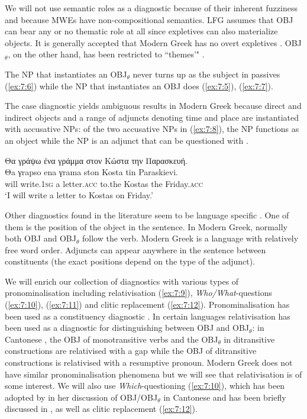\documentclass[output=paper]{langsci/langscibook}
\begin{document}
We will not use semantic roles as a diagnostic because of their inherent fuzziness \citep{dowty90} and because MWEs have non-compositional semantics.  LFG assumes that OBJ can bear any or no thematic role at all since expletives can also materialize objects. It is generally accepted that Modern Greek has no overt expletives \citep{kotzoglou2001}. OBJ$_\theta$, on the other hand, has been restricted to ``themes'" \citep{bresnanmoshi1990}. 

The NP that instantiates an OBJ$_\theta$ never turns up as the subject in passives (\ref{ex:7:6}) while the NP that instantiates an OBJ does (\ref{ex:7:5}), (\ref{ex:7:7}).

The case diagnostic yields ambiguous results in Modern Greek because direct and indirect objects and a range of adjuncts denoting time and place are instantiated with accusative NPs: of the two accusative NPs in (\ref{ex:7:8}), the NP  functions as an object while the  NP  is an adjunct that can be questioned with .  

\ea%
    \label{ex:7:8}
\glll Θα γράψω ένα γράμμα στον Κώστα την Παρασκευή.\\
Θa γrapso ena γrama ston Kosta tin Paraskievi.\\
          will write.\textsc{1sg}   a  letter.\textsc{acc} to.the Kostas the  Friday.\textsc{acc}\\
\glt `I will write a letter to Kostas on Friday.'
\z

Other diagnostics found in the literature seem to be language specific \citep{lam2008}. One of them is the position of the object in the sentence. In Modern Greek, normally both OBJ and OBJ$_\theta$ follow the verb. Modern Greek is a language with relatively free word order. Adjuncts can appear anywhere in the sentence between constituents (the exact positions depend on the type of the adjunct).

We will enrich our collection of diagnostics with various types of pronominalisation  including relativisation (\ref{ex:7:9}), \textit{Who/What}-questions (\ref{ex:7:10}), (\ref{ex:7:11}) and clitic replacement (\ref{ex:7:12}). Pronominalisation has been used as a constituency diagnostic \citep{radford1988}. In certain languages relativisation has been used as a diagnostic for distinguishing between OBJ and OBJ$_\theta$: in Cantonese \citep{lam2008}, the OBJ of monotransitive verbs and the OBJ$_\theta$ in ditransitive constructions are relativised with a gap while the OBJ of ditransitive constructions is relativised with a resumptive pronoun. Modern Greek does not have similar pronominalisation phenomena but we will see that  relativisation is of some interest.  We will also use \textit{Which}-questioning (\ref{ex:7:10}), which has been adopted by \citet{lam2008} in her discussion of OBJ/OBJ$_\theta$ in Cantonese and has been briefly discussed in \citet{kaysagidioms}, as well as clitic replacement (\ref{ex:7:12}). 
\end{document}
